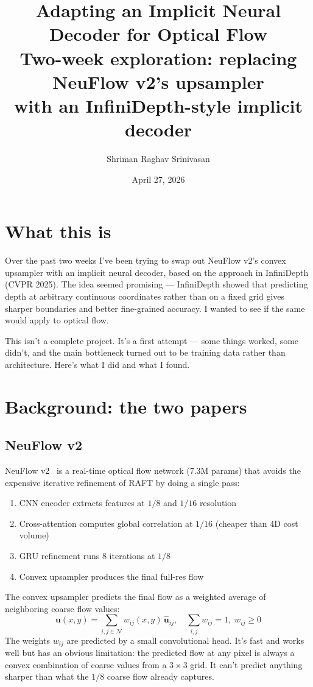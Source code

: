 \documentclass[11pt,a4paper]{article}
\title{\textbf{Adapting an Implicit Neural Decoder for Optical Flow}\\[0.3em]
\large Two-week exploration: replacing NeuFlow v2's upsampler\\
with an InfiniDepth-style implicit decoder}
\author{Shriman Raghav Srinivasan}
\date{April 27, 2026}
\begin{document}
\maketitle\thispagestyle{fancy}

\section*{What this is}

Over the past two weeks I've been trying to swap out NeuFlow v2's convex upsampler with an implicit neural decoder, based on the approach in InfiniDepth (CVPR 2025). The idea seemed promising --- InfiniDepth showed that predicting depth at arbitrary continuous coordinates rather than on a fixed grid gives sharper boundaries and better fine-grained accuracy. I wanted to see if the same would apply to optical flow.

This isn't a complete project. It's a first attempt --- some things worked, some didn't, and the main bottleneck turned out to be training data rather than architecture. Here's what I did and what I found.

\section{Background: the two papers}

\subsection{NeuFlow v2}

NeuFlow v2~\cite{neuflowv2} is a real-time optical flow network (7.3M params) that avoids the expensive iterative refinement of RAFT by doing a single pass:
\begin{enumerate}[leftmargin=*,itemsep=1pt]
  \item CNN encoder extracts features at $1/8$ and $1/16$ resolution
  \item Cross-attention computes global correlation at $1/16$ (cheaper than 4D cost volume)
  \item GRU refinement runs 8 iterations at $1/8$
  \item Convex upsampler produces the final full-res flow
\end{enumerate}

The convex upsampler predicts the final flow as a weighted average of neighboring coarse flow values:
\[
  \mathbf{u}(x,y) = \sum_{i,j \in \mathcal{N}} w_{ij}(x,y)\,\hat{\mathbf{u}}_{ij}, \quad \sum_{i,j} w_{ij}=1,\; w_{ij}\ge 0
\]
The weights $w_{ij}$ are predicted by a small convolutional head. It's fast and works well but has an obvious limitation: the predicted flow at any pixel is always a convex combination of coarse values from a $3\times3$ grid. It can't predict anything sharper than what the $1/8$ coarse flow already captures.
\end{document}
